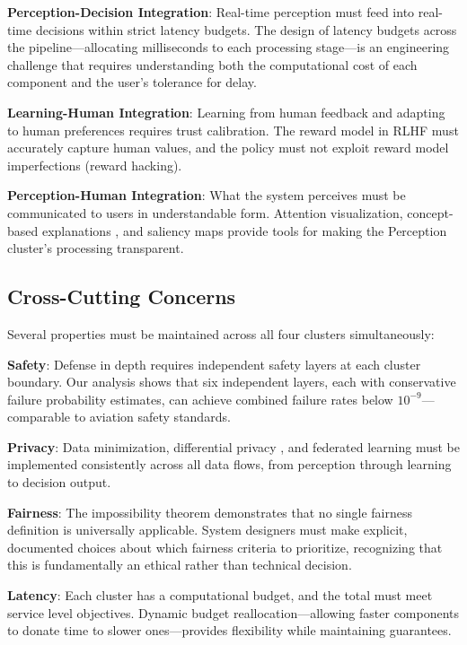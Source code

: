 \documentclass[11pt,a4paper]{article}
\begin{document}
\textbf{Perception-Decision Integration}: Real-time perception must feed into real-time decisions within strict latency budgets. The design of latency budgets across the pipeline---allocating milliseconds to each processing stage---is an engineering challenge that requires understanding both the computational cost of each component and the user's tolerance for delay.

\textbf{Learning-Human Integration}: Learning from human feedback \citep{christiano2017,ouyang2022} and adapting to human preferences requires trust calibration. The reward model in RLHF must accurately capture human values, and the policy must not exploit reward model imperfections (reward hacking).

\textbf{Perception-Human Integration}: What the system perceives must be communicated to users in understandable form. Attention visualization, concept-based explanations \citep{kim2018}, and saliency maps provide tools for making the Perception cluster's processing transparent.

\subsection{Cross-Cutting Concerns}

Several properties must be maintained across all four clusters simultaneously:

\textbf{Safety}: Defense in depth \citep{reason1990} requires independent safety layers at each cluster boundary. Our analysis shows that six independent layers, each with conservative failure probability estimates, can achieve combined failure rates below $10^{-9}$---comparable to aviation safety standards.

\textbf{Privacy}: Data minimization, differential privacy \citep{dwork2006}, and federated learning must be implemented consistently across all data flows, from perception through learning to decision output.

\textbf{Fairness}: The impossibility theorem \citep{chouldechova2017} demonstrates that no single fairness definition is universally applicable. System designers must make explicit, documented choices about which fairness criteria to prioritize, recognizing that this is fundamentally an ethical rather than technical decision.

\textbf{Latency}: Each cluster has a computational budget, and the total must meet service level objectives. Dynamic budget reallocation---allowing faster components to donate time to slower ones---provides flexibility while maintaining guarantees.
\end{document}
